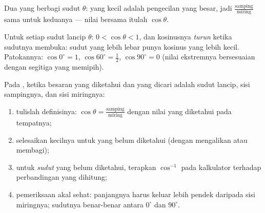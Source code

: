 \begin{omfigure}

{\small Dua  yang berbagi sudut $\theta$: yang kecil
adalah pengecilan yang besar, jadi
$\frac{\text{samping}}{\text{miring}}$ sama untuk keduanya ---
nilai bersama itulah $\cos\theta$.}
\end{omfigure}

\begin{proposition}\label{prop:g8:cosine:bounds}
Untuk setiap sudut lancip $\theta$: $0 < \cos\theta < 1$, dan
kosinusnya \emph{turun} ketika sudutnya membuka: sudut yang lebih
lebar punya kosinus yang lebih kecil. Patokannya:
$\cos 0^\circ = 1$, $\cos 60^\circ = \frac12$, $\cos 90^\circ = 0$
(nilai ekstremnya bersesuaian dengan segitiga yang memipih).
\end{proposition}
\admitted

\begin{method}\label{met:g8:cosine:use}
Pada , ketika besaran yang diketahui dan yang dicari
adalah sudut lancip, sisi sampingnya, dan sisi miringnya:
\begin{enumerate}
  \item tulislah definisinya:
        $\cos\theta = \frac{\text{samping}}{\text{miring}}$ dengan
        nilai yang diketahui pada tempatnya;
  \item selesaikan  kecilnya untuk yang belum diketahui
        (dengan mengalikan atau membagi);
  \item untuk \emph{sudut} yang belum diketahui, terapkan
        $\cos^{-1}$ pada kalkulator terhadap perbandingan yang
        dihitung;
  \item pemeriksaan akal sehat: panjangnya harus keluar lebih pendek
        daripada sisi miringnya; sudutnya benar-benar antara
        $0^\circ$ dan $90^\circ$.
\end{enumerate}
\end{method}

